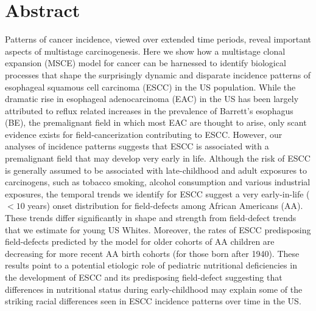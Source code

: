 \documentclass[10pt,letterpaper]{article}
\begin{document}
\section*{Abstract}
Patterns of cancer incidence, viewed over extended time periods, reveal important aspects of multistage carcinogenesis. Here we show how a multistage clonal expansion (MSCE) model for cancer can be harnessed to identify biological processes that shape the surprisingly dynamic and disparate incidence patterns of esophageal squamous cell carcinoma (ESCC) in the US population. While the dramatic rise in esophageal adenocarcinoma (EAC) in the US has been largely attributed to reflux related increases in the prevalence of Barrett's esophagus (BE), the premalignant field in which most EAC are thought to arise, only scant evidence exists for field-cancerization contributing to ESCC. However, our analyses of incidence patterns suggests that ESCC is associated with a premalignant field that may develop very early in life. Although the risk of ESCC is generally assumed to be associated with late-childhood and adult exposures to carcinogens, such as tobacco smoking, alcohol consumption and various industrial exposures, the temporal trends we identify for ESCC suggest a very early-in-life ($< 10$ years) onset distribution for field-defects among African Americans (AA). These trends differ significantly in shape and strength from field-defect trends that we estimate for young US Whites. Moreover, the rates of ESCC predisposing field-defects predicted by the model for older cohorts of AA children are decreasing for more recent AA birth cohorts (for those born after 1940). These results point to a potential etiologic role of pediatric nutritional deficiencies in the development of ESCC and its predisposing field-defect suggesting that differences in nutritional status during early-childhood may explain some of the striking racial differences seen in ESCC incidence patterns over time in the US. 
\end{document}
